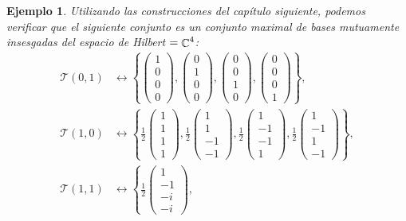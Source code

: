 \documentclass[a4paper,11pt]{report}
\DeclareMathOperator{\C}{\mathbb{C}}
\let\H\relax
\DeclareMathOperator{\H}{\mathcal H}
\newtheorem{example}{Ejemplo}
\begin{document}
\begin{example}
    Utilizando las construcciones del capítulo siguiente,
    podemos verificar que el siguiente conjunto es un
    conjunto maximal de bases mutuamente insesgadas del
    espacio de Hilbert $\H = \C^{4}$:
    \begin{align}
      \mathcal T(0,1) &\leftrightarrow \left\{
      \begin{pmatrix} 1\\0\\0\\0 \end{pmatrix},
      \begin{pmatrix} 0\\1\\0\\0 \end{pmatrix},
      \begin{pmatrix} 0\\0\\1\\0 \end{pmatrix},
      \begin{pmatrix} 0\\0\\0\\1 \end{pmatrix}
      \right\}, \\
      \mathcal T(1,0) &\leftrightarrow \left\{
      \frac{1}{2} \begin{pmatrix} 1\\1\\1\\1 \end{pmatrix}, 
      \frac{1}{2} \begin{pmatrix} 1\\1\\-1\\-1 \end{pmatrix}, 
      \frac{1}{2} \begin{pmatrix} 1\\-1\\-1\\1 \end{pmatrix},
      \frac{1}{2} \begin{pmatrix} 1\\-1\\1\\-1 \end{pmatrix} 
      \right\}, \\
      \mathcal T(1,1) &\leftrightarrow \left\{
      \frac{1}{2} \begin{pmatrix} 1\\-1\\-i\\-i \end{pmatrix}, 

\end{align}
\end{example}
\end{document}
